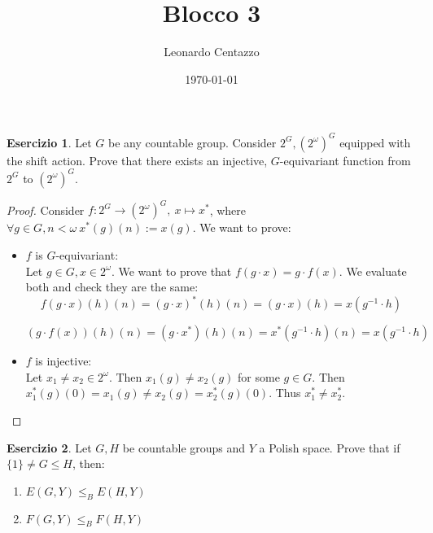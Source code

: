 \documentclass[a4paper,12pt]{article}
\title{Blocco 3}
\author{Leonardo Centazzo}
\date{\today}
\theoremstyle{plain}
\theoremstyle{definition}
\newtheorem{esercizio}{Esercizio}
\theoremstyle{remark}
\begin{document}
\maketitle


\begin{esercizio}
	Let $G$ be any countable group. Consider $2^G, (2^\omega)^G$ equipped with the shift action.
	Prove that there exists an injective, $G$-equivariant function from $2^G$ to $(2^\omega)^G$.
\end{esercizio}

\begin{proof}
	Consider $f: 2^G \to (2^\omega)^G, \ x \mapsto x^{*}$, where
	$\forall g \in G, n < \omega \ x^{*}(g)(n) := x(g)$.
	We want to prove:
	\begin{itemize}
		\item $f$ is $G$-equivariant: \\
			Let $g \in G, x \in 2^{\omega}$. We want to prove that $f(g \cdot x) = g \cdot f(x)$.
			We evaluate both and check they are the same:
			\[
				f(g \cdot x)(h)(n) = (g \cdot x)^{*} (h)(n) =
				(g \cdot x) (h) = x(g^{-1} \cdot h)
			\]

			\[
				(g \cdot f(x))(h)(n) = (g \cdot x^{*})(h)(n) = 
				x^{*}(g^{-1} \cdot h)(n) = x(g^{-1} \cdot h)
			\]

		\item $f$ is injective: \\
			Let $x_1 \not = x_2 \in 2^{\omega}$. Then $x_1 (g) \not = x_2(g)$ for some $g \in G$.
			Then $x_1 ^{*}(g)(0) = x_1 (g) \not = x_2 (g) = x_2 ^{*}(g)(0)$.
			Thus $x_1 ^{*} \not = x_2 ^{*}$.

	\end{itemize}

\end{proof}





\begin{esercizio}
	Let $G,H$ be countable groups and $Y$ a Polish space.
	Prove that if $\{1\} \not = G \leq H$, then:
	\begin{enumerate}
		\item $E(G,Y) \leq_B E(H,Y)$
		\item $F(G,Y) \leq_B F(H,Y)$
	\end{enumerate}
\end{esercizio}
\end{document}
